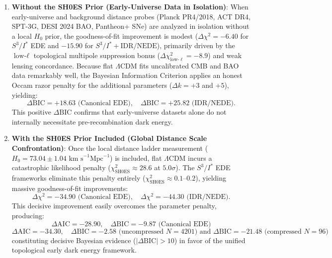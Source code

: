 \documentclass[11pt,a4paper]{article}
\theoremstyle{definition}
\newcommand{\LCDM}{\Lambda\mathrm{CDM}}
\newcommand{\NEDE}{\mathrm{NEDE}}
\newcommand{\IDR}{\mathrm{IDR}}
\begin{document}
\begin{enumerate}
    \item \textbf{Without the SH0ES Prior (Early-Universe Data in Isolation)}:
    When early-universe and background distance probes (Planck PR4/2018, ACT DR4, SPT-3G, DESI 2024 BAO, Pantheon+ SNe) are analyzed in isolation without a local $H_0$ prior, the goodness-of-fit improvement is modest ($\Delta \chi^2 = -6.40$ for $S^3/I^*$ EDE and $-15.90$ for $S^3/I^* + \IDR/\NEDE$), primarily driven by the $\text{low-}\ell$ topological multipole suppression bonus ($\Delta \chi^2_{\mathrm{low}\text{-}\ell} = -8.9$) and weak lensing concordance. Because flat $\LCDM$ fits uncalibrated CMB and BAO data remarkably well, the Bayesian Information Criterion applies an honest Occam razor penalty for the additional parameters ($\Delta k = +3$ and $+5$), yielding:
    \begin{equation}
    \Delta \mathrm{BIC} = +18.63\text{ (Canonical EDE)}, \quad \Delta \mathrm{BIC} = +25.82\text{ (IDR/NEDE)}.
    \end{equation}
    This positive $\Delta\mathrm{BIC}$ confirms that early-universe datasets alone do not internally necessitate pre-recombination dark energy.

    \item \textbf{With the SH0ES Prior Included (Global Distance Scale Confrontation)}:
    Once the local distance ladder measurement ($H_0 = 73.04 \pm 1.04\text{ km s}^{-1}\text{Mpc}^{-1}$) is included, flat $\LCDM$ incurs a catastrophic likelihood penalty ($\chi^2_{\mathrm{SH0ES}} \approx 28.6$ at $5.0\sigma$). The $S^3/I^*$ EDE frameworks eliminate this penalty entirely ($\chi^2_{\mathrm{SH0ES}} \approx 0.1\text{--}0.2$), yielding massive goodness-of-fit improvements:
    \begin{equation}
    \Delta \chi^2 = -34.90\text{ (Canonical EDE)}, \quad \Delta \chi^2 = -44.30\text{ (IDR/NEDE)}.
    \end{equation}
    This decisive improvement easily overcomes the parameter penalty, producing:
    \begin{equation}
    \Delta \mathrm{AIC} = -28.90, \quad \Delta \mathrm{BIC} = -9.87\text{ (Canonical EDE)}
    \end{equation}
    \begin{equation}
    \Delta \mathrm{AIC} = -34.30, \quad \Delta \mathrm{BIC} = -2.58\text{ (uncompressed } N=4201\text{) and } \Delta \mathrm{BIC} = -21.48\text{ (compressed } N=96\text{)}
    \end{equation}
    constituting decisive Bayesian evidence ($\lvert \Delta \mathrm{BIC} \rvert > 10$) in favor of the unified topological early dark energy framework.
\end{enumerate}
\end{document}

